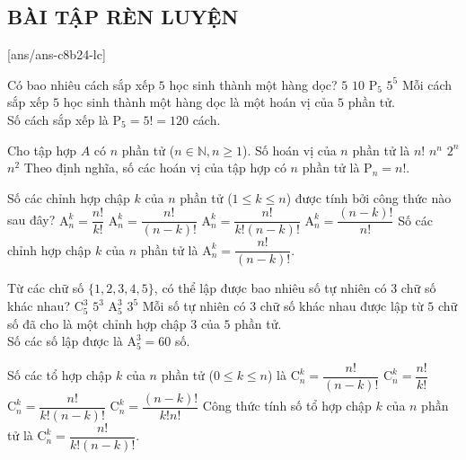 \subsection{BÀI TẬP RÈN LUYỆN}
 
\setcounter{ex}{0}
[ans/ans-c8b24-lc]
\begin{ex}%
	Có bao nhiêu cách sắp xếp $5$ học sinh thành một hàng dọc?
	\choice
	{$5$}
	{$10$}
	{\True $\mathrm{P}_5$}
	{$5^5$}
	\loigiai
	{
		Mỗi cách sắp xếp $5$ học sinh thành một hàng dọc là một hoán vị của $5$ phần tử.\\
		Số cách sắp xếp là $\mathrm{P}_5 = 5! = 120$ cách.
	}
\end{ex}
\begin{ex}%
	Cho tập hợp $A$ có $n$ phần tử ($n \in \mathbb{N}, n \ge 1$). Số hoán vị của $n$ phần tử là
	\choice
	{\True $n!$}
	{$n^n$}
	{$2^n$}
	{$n^2$}
	\loigiai
	{
		Theo định nghĩa, số các hoán vị của tập hợp có $n$ phần tử là $\mathrm{P}_n = n!$.
	}
\end{ex}
\begin{ex}%
	Số các chỉnh hợp chập $k$ của $n$ phần tử ($1 \le k \le n$) được tính bởi công thức nào sau đây?
	\choice
	{$\mathrm{A}_n^k = \dfrac{n!}{k!}$}
	{\True $\mathrm{A}_n^k = \dfrac{n!}{(n-k)!}$}
	{$\mathrm{A}_n^k = \dfrac{n!}{k!(n-k)!}$}
	{$\mathrm{A}_n^k = \dfrac{(n-k)!}{n!}$}
	\loigiai
	{
		Số các chỉnh hợp chập $k$ của $n$ phần tử là $\mathrm{A}_n^k = \dfrac{n!}{(n-k)!}$.
	}
\end{ex}
\begin{ex}%
	Từ các chữ số $\{1, 2, 3, 4, 5\}$, có thể lập được bao nhiêu số tự nhiên có $3$ chữ số khác nhau?
	\choice
	{$\mathrm{C}_5^3$}
	{$5^3$}
	{\True $\mathrm{A}_5^3$}
	{$3^5$}
	\loigiai
	{
		Mỗi số tự nhiên có $3$ chữ số khác nhau được lập từ $5$ chữ số đã cho là một chỉnh hợp chập $3$ của $5$ phần tử.\\
		Số các số lập được là $\mathrm{A}_5^3 = 60$ số.
	}
\end{ex}
\begin{ex}%
	Số các tổ hợp chập $k$ của $n$ phần tử ($0 \le k \le n$) là
	\choice
	{$\mathrm{C}_n^k = \dfrac{n!}{(n-k)!}$}
	{$\mathrm{C}_n^k = \dfrac{n!}{k!}$}
	{\True $\mathrm{C}_n^k = \dfrac{n!}{k!(n-k)!}$}
	{$\mathrm{C}_n^k = \dfrac{(n-k)!}{k!n!}$}
	\loigiai
	{
		Công thức tính số tổ hợp chập $k$ của $n$ phần tử là $\mathrm{C}_n^k = \dfrac{n!}{k!(n-k)!}$.
	}
\end{ex}
